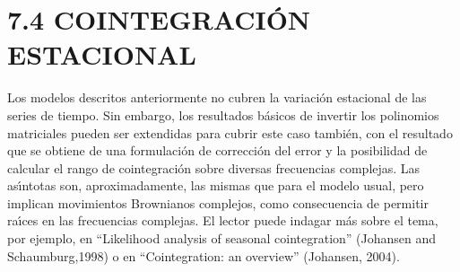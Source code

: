 \section{7.4 COINTEGRACI\'{O}N ESTACIONAL}
\label{subsec:mylabel6}
Los modelos descritos anteriormente no 
cubren la variaci\'{o}n estacional de las series de tiempo. Sin embargo, los 
resultados b\'{a}sicos de invertir los polinomios matriciales pueden ser 
extendidas para cubrir este caso tambi\'{e}n, con el resultado que se 
obtiene de una formulaci\'{o}n de correcci\'{o}n del error y la posibilidad 
de calcular el rango de cointegraci\'{o}n sobre diversas frecuencias 
complejas. Las as\'{\i}ntotas son, aproximadamente, las mismas que para el 
modelo usual, pero implican movimientos Brownianos complejos, como 
consecuencia de permitir ra\'{\i}ces en las frecuencias complejas. El lector 
puede indagar m\'{a}s sobre el tema, por ejemplo, en ``Likelihood analysis 
of seasonal cointegration'' (Johansen and Schaumburg,1998) o en 
``Cointegration: an overview'' (Johansen, 2004).